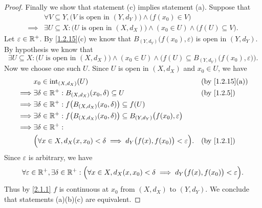 \begin{proof}
  Finally we show that statement (c) implies statement (a).
  Suppose that
  \begin{align*}
             & \forall V \subseteq Y, \big(V \text{ is open in } (Y, d_Y)\big) \land \big(f(x_0) \in V\big)                         \\
    \implies & \exists U \subseteq X : \big(U \text{ is open in } (X, d_X)\big) \land (x_0 \in U) \land \big(f(U) \subseteq V\big).
  \end{align*}
  Let \(\varepsilon \in \mathbb{R}^+\).
  By \cref{1.2.15}(c) we know that \(B_{(Y, d_Y)}\big(f(x_0), \varepsilon\big)\) is open in \((Y, d_Y)\).
  By hypothesis we know that
  \[
    \exists U \subseteq X : \big(U \text{ is open in } (X, d_X)\big) \land (x_0 \in U) \land \Big(f(U) \subseteq B_{(Y, d_Y)}\big(f(x_0), \varepsilon\big)\Big).
  \]
  Now we choose one such \(U\).
  Since \(U\) is open in \((X, d_X)\) and \(x_0 \in U\), we have
  \begin{align*}
             & x_0 \in \text{int}_{(X, d_X)}(U)                                                                                   &  & \text{(by \cref{1.2.15}(a))} \\
    \implies & \exists \delta \in \R^+ : B_{(X, d_X)}(x_0, \delta) \subseteq U                                                    &  & \by{1.2.5}                   \\
    \implies & \exists \delta \in \R^+ : f\big(B_{(X, d_X)}(x_0, \delta)\big) \subseteq f(U)                                                                        \\
    \implies & \exists \delta \in \R^+ : f\big(B_{(X, d_X)}(x_0, \delta)\big) \subseteq B_{(Y, d_Y)}\big(f(x_0), \varepsilon\big)                                   \\
    \implies & \exists \delta \in \R^+ :                                                                                                                            \\
             & \Big(\forall x \in X, d_X(x, x_0) < \delta \implies d_Y\big(f(x), f(x_0)\big) < \varepsilon\Big).                  &  & \by{1.2.1}
  \end{align*}
  Since \(\varepsilon\) is arbitrary, we have
  \[
    \forall \varepsilon \in \mathbb{R}^+, \exists \delta \in \mathbb{R}^+ : \Big(\forall x \in X, d_X(x, x_0) < \delta \implies d_Y\big(f(x), f(x_0)\big) < \varepsilon\Big).
  \]
  Thus by \cref{2.1.1} \(f\) is continuous at \(x_0\) from \((X, d_X)\) to \((Y, d_Y)\).
  We conclude that statements (a)(b)(c) are equivalent.
\end{proof}

